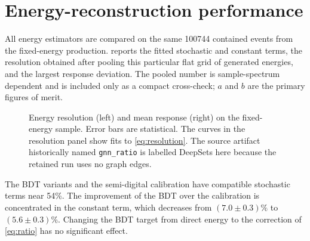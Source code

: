 \documentclass[11pt,a4paper]{article}
\begin{document}
\section{Energy-reconstruction performance}
\label{sec:energy-results}

All energy estimators are compared on the same 100744 contained events from the
fixed-energy production.  reports the fitted stochastic and constant
terms, the resolution obtained after pooling this particular flat grid of generated
energies, and the largest response deviation. The pooled number is sample-spectrum
dependent and is included only as a compact cross-check; $a$ and $b$ are the primary
figures of merit.

\begin{table}[tb]
  \centering
  \caption{Energy performance on the common contained external sample. ``Correction''
  denotes the target in \cref{eq:ratio}. The pooled $\sigma/E$ depends on the flat
  generated spectrum and is not an intrinsic detector resolution.}
  \label{tab:energy}
\end{table}

\begin{figure}[tb]
  \centering
  
  \caption{Energy resolution (left) and mean response (right) on the fixed-energy
  sample. Error bars are statistical. The curves in the resolution panel show fits to
  \cref{eq:resolution}. The source artifact historically named \texttt{gnn\_ratio}
  is labelled DeepSets here because the retained run uses no graph edges.}
  \label{fig:energy}
\end{figure}

The BDT variants and the semi-digital calibration have compatible stochastic terms
near 54\%. The improvement of the BDT over the calibration is concentrated in the
constant term, which decreases from $(7.0\pm0.3)\%$ to $(5.6\pm0.3)\%$. Changing the
BDT target from direct energy to the correction of \cref{eq:ratio} has no significant
effect.
\end{document}
